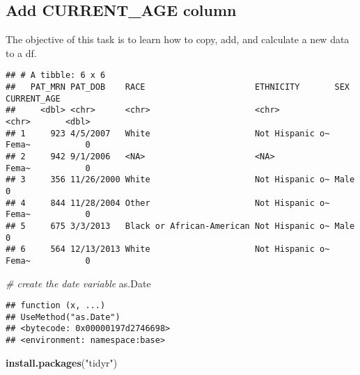 \documentclass[
]{article}
\newenvironment{Shaded}{\begin{snugshade}}{\end{snugshade}}
\newcommand{\CommentTok}[1]{\textcolor[rgb]{0.56,0.35,0.01}{\textit{#1}}}
\newcommand{\DecValTok}[1]{\textcolor[rgb]{0.00,0.00,0.81}{#1}}
\newcommand{\FunctionTok}[1]{\textcolor[rgb]{0.13,0.29,0.53}{\textbf{#1}}}
\newcommand{\NormalTok}[1]{#1}
\newcommand{\OtherTok}[1]{\textcolor[rgb]{0.56,0.35,0.01}{#1}}
\newcommand{\SpecialCharTok}[1]{\textcolor[rgb]{0.81,0.36,0.00}{\textbf{#1}}}
\newcommand{\StringTok}[1]{\textcolor[rgb]{0.31,0.60,0.02}{#1}}
\begin{document}
\hypertarget{add-current_age-column}{%
\subsection{Add CURRENT\_AGE column}\label{add-current_age-column}}

The objective of this task is to learn how to copy, add, and calculate a
new data to a df.

\begin{Shaded}
\end{Shaded}

\begin{verbatim}
## # A tibble: 6 x 6
##   PAT_MRN PAT_DOB    RACE                      ETHNICITY       SEX   CURRENT_AGE
##     <dbl> <chr>      <chr>                     <chr>           <chr>       <dbl>
## 1     923 4/5/2007   White                     Not Hispanic o~ Fema~           0
## 2     942 9/1/2006   <NA>                      <NA>            Fema~           0
## 3     356 11/26/2000 White                     Not Hispanic o~ Male            0
## 4     844 11/28/2004 Other                     Not Hispanic o~ Fema~           0
## 5     675 3/3/2013   Black or African-American Not Hispanic o~ Male            0
## 6     564 12/13/2013 White                     Not Hispanic o~ Fema~           0
\end{verbatim}

\begin{Shaded}
\begin{Highlighting}[]
\CommentTok{\# create the date variable}
\NormalTok{as.Date}
\end{Highlighting}
\end{Shaded}

\begin{verbatim}
## function (x, ...) 
## UseMethod("as.Date")
## <bytecode: 0x00000197d2746698>
## <environment: namespace:base>
\end{verbatim}

\begin{Shaded}
\begin{Highlighting}[]
\FunctionTok{install.packages}\NormalTok{(}\StringTok{"tidyr"}\NormalTok{)}
\end{Highlighting}
\end{Shaded}
\end{document}
